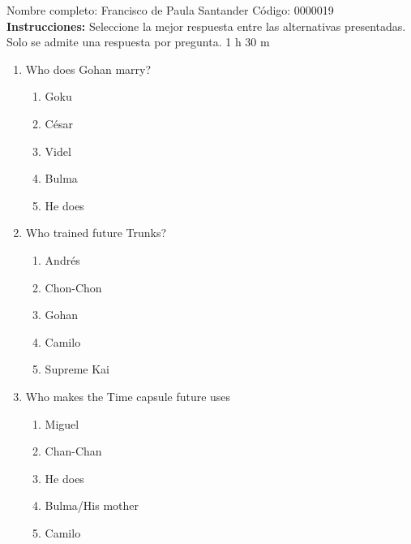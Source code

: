 \documentclass[letterpaper,addpoints,answers,twocolumn,10pt]{exam}
\begin{document}
\noindent Nombre completo: Francisco de Paula Santander
\newline \newline \newline \newline
Código: 0000019\newline \newline 
{\bf Instrucciones:} Seleccione la mejor respuesta entre las alternativas presentadas. Solo se admite una respuesta por pregunta.
 1 h 30 m

\begin{enumerate}[leftmargin=.2in]




\item  Who does Gohan marry?


\begin{enumerate}[noitemsep,leftmargin=0in]


\item  Goku
\item  César
\item  Videl
\item  Bulma
\item  He does


\end{enumerate}



\item  Who trained future Trunks?


\begin{enumerate}[noitemsep,leftmargin=0in]


\item  Andrés
\item  Chon-Chon
\item  Gohan
\item  Camilo
\item  Supreme Kai


\end{enumerate}



\item  Who makes the Time capsule future uses


\begin{enumerate}[noitemsep,leftmargin=0in]


\item  Miguel
\item  Chan-Chan
\item  He does
\item  Bulma/His mother
\item  Camilo



\end{enumerate}
\end{enumerate}
\end{document}
